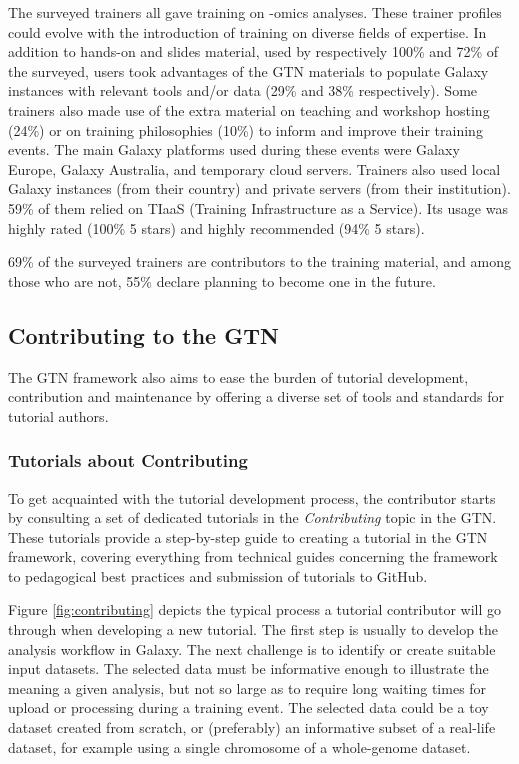 \documentclass[10pt,letterpaper]{article}
\begin{document}
The surveyed trainers all gave training on -omics analyses.
These trainer profiles could evolve with the introduction of training on diverse fields of expertise. In addition to hands-on and slides material, used by respectively 100\% and 72\% of the surveyed, users took advantages of the GTN materials to populate Galaxy instances with relevant tools and/or data (29\% and 38\% respectively).
Some trainers also made use of the extra material on teaching and workshop hosting (24\%) or on training philosophies (10\%) to inform and improve their training events.
The main Galaxy platforms used during these events were Galaxy Europe, Galaxy  Australia, and temporary cloud servers. Trainers also used local Galaxy instances (from their country) and  private servers (from their institution).
59\% of them relied on TIaaS (Training Infrastructure as a Service). Its usage was highly rated (100\% 5 stars) and highly recommended (94\% 5 stars).

69\% of the surveyed trainers are contributors to the training material, and among those who are not, 55\% declare planning to become one in the future.



\subsection*{Contributing to the GTN}

The GTN framework also aims to ease the burden of tutorial development, contribution and maintenance by offering a diverse set of tools and standards for tutorial authors. 

\subsubsection*{Tutorials about Contributing}

To get acquainted with the tutorial development process, the contributor starts by consulting a set of dedicated tutorials in the \emph{Contributing} topic in the GTN. These tutorials provide a step-by-step guide to creating a tutorial in the GTN framework, covering everything from technical guides concerning the framework to pedagogical best practices and submission of tutorials to GitHub.

Figure \ref{fig:contributing} depicts the typical process a tutorial contributor will go through when developing a new tutorial. The first step is usually to develop the analysis workflow in Galaxy. The next challenge is to identify or create suitable input datasets. The selected data must be informative enough to illustrate the meaning a given analysis, but not so large as to require long waiting times for upload or processing during a training event. The selected data could be a toy dataset created from scratch, or (preferably) an informative subset of a real-life dataset, for example using a single chromosome of a whole-genome dataset.
\end{document}
